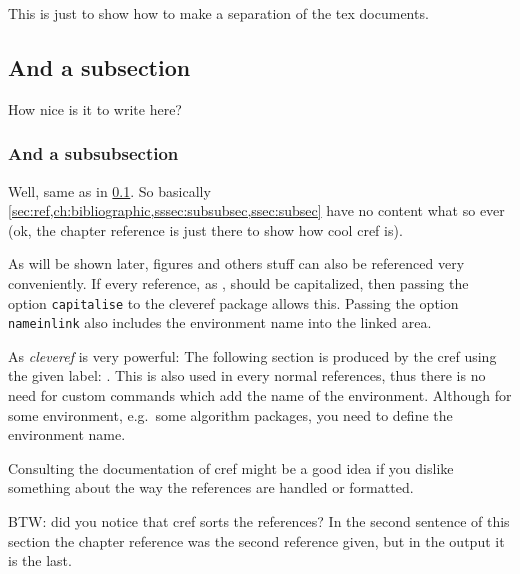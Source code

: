 \label{sec:ref}

This is just to show how to make a separation of the tex documents.

\subsection{And a subsection}
\label{ssec:subsec}

How nice is it to write here?

\subsubsection{And a subsubsection}
\label{sssec:subsubsec}

Well, same as in \cref{ssec:subsec}.
So basically \cref{sec:ref,ch:bibliographic,sssec:subsubsec,ssec:subsec} have
no content what so ever (ok, the chapter reference is just there to show how
cool cref is).

As will be shown later, figures and others stuff can also be referenced very
conveniently.
If every reference, as , should be capitalized, then passing the
option \texttt{capitalise} to the cleveref package allows this.
Passing the option \texttt{nameinlink} also includes the environment name into
the linked area.

As \emph{cleveref} is very powerful:
The following section is produced by the cref using the given label:
.
This is also used in every normal references, thus there is no need for custom
commands which add the name of the environment.
Although for some environment, e.g.\ some algorithm packages, you need to
define the environment name.

Consulting the documentation of cref might be a good idea if you dislike
something about the way the references are handled or formatted.

BTW: did you notice that cref sorts the references?
In the second sentence of this section the chapter reference was the second
reference given, but in the output it is the last.

